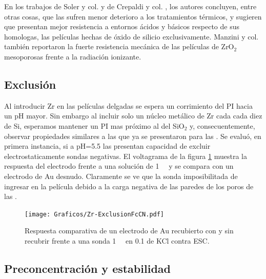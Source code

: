 			En los trabajos de Soler y col. y de Crepaldi y col. \cite{Soler-Illia2004,Crepaldi2002a}, los autores concluyen, entre otras cosas, que las \pdmZ\space sufren menor deterioro a los tratamientos térmicos, y sugieren que presentan mejor resistencia a entornos ácidos y básicos respecto de sus homologas, las películas hechas de óxido de silicio exclusivamente. Manzini y col.\cite{Gimenez2016} también reportaron la fuerte resistencia mecánica de las películas de ZrO$_2$ mesoporosas frente a la radiación ionizante.

	 \subsection{Exclusión}

	 	 Al introducir Zr en las películas delgadas se espera un corrimiento del PI hacia un pH mayor\cite{Kosmulski2014}. Sin embargo al incluir solo un núcleo metálico de Zr cada cada diez de Si, esperamos mantener un PI mas próximo al del SiO$_2$ y, consecuentemente, observar propiedades similares a las que ya se presentaron para las \pdmF.
	 	 Se evaluó, en primera instancia, si a pH=5.5 las \pdmZ\space presentan capacidad de excluir electrostaticamente sondas negativas. El voltagrama de la figura \ref{fig:fcn-zr} muestra la respuesta del electrodo frente a una solución de \fe\space \SI{1}{\milli\Molar} y se compara con un electrodo de Au desnudo. Claramente se ve que la sonda imposibilitada de ingresar en la película debido a la carga negativa de las paredes de los poros de las \pdmZ. 
				
				\begin{figure}[ht]
				\centering
		 	    \texttt{[image: Graficos/Zr-ExclusionFcCN.pdf]}
		        \caption[Exclusión electrostática en \pdmZ]{Respuesta comparativa de un electrodo de Au recubierto con \pdmZ\space y sin recubrir frente a una sonda \ferroferri\space \SI{1}{\milli\Molar} en \SI{0.1}{\Molar} de KCl contra ESC.}
		        \label{fig:fcn-zr}
		      	\end{figure} 
	
	 \subsection{Preconcentración y estabilidad}


